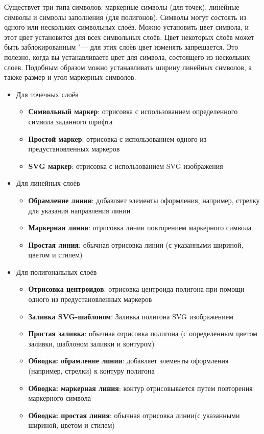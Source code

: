 Существует три типа символов: маркерные символы (для точек), линейные символы
и символы заполнения (для полигонов). Символы могут состоять из одного или
нескольких символьных слоёв. Можно установить цвет символа, и этот цвет
установится для всех символьных слоёв. Цвет некоторых слоёв может быть
заблокированным "--- для этих слоёв цвет изменять запрещается. Это полезно,
когда вы устанавливаете цвет для символа, состоящего из нескольких слоев.
Подобным образом можно устанавливать ширину линейных символов, а также
размер и угол маркерных символов.


\begin{itemize}[label=--]
\item Для точечных слоёв
\begin{itemize}[label=--]
\item \textbf{Символьный маркер}: отрисовка с использованием определенного
символа заданного шрифта
\item \textbf{Простой маркер}: отрисовка с использованием одного
из предустановленных маркеров
\item \textbf{SVG маркер}: отрисовка с использованием SVG изображения
\end{itemize}
\item Для линейных слоёв
\begin{itemize}[label=--]
\item \textbf{Обрамление линии}: добавляет элементы оформления, например,
стрелку для указания направления линии
\item \textbf{Маркерная линия}: отрисовка линии повторением маркерного символа
\item \textbf{Простая линия}: обычная отрисовка линии (с указанными шириной,
цветом и стилем)
\end{itemize}
\item Для полигональных слоёв
\begin{itemize}[label=--]
\item \textbf{Отрисовка центроидов}: отрисовка центроида полигона при помощи
одного из предустановленных маркеров
\item \textbf{Заливка SVG-шаблоном}: Заливка полигона SVG изображением
\item \textbf{Простая заливка}: обычная отрисовка полигона (с определенным
цветом заливки, шаблоном заливки и контуром)
\item \textbf{Обводка: обрамление линии}: добавляет элементы оформления
(например, стрелки) к контуру полигона
\item \textbf{Обводка: маркерная линия}: контур отрисовывается путем
повторения маркерного символа
\item \textbf{Обводка: простая линия}: обычная отрисовка линии(с указанными шириной,
цветом и стилем)
\end{itemize}
\end{itemize}

